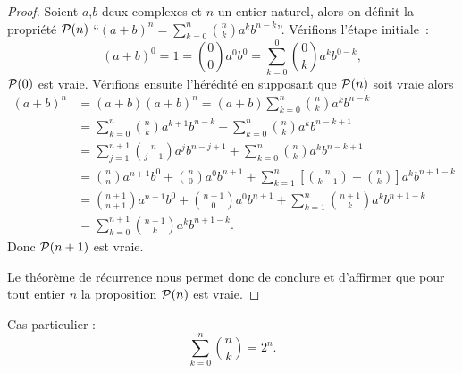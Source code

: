 \begin{proof}
  Soient \(a\),\(b\) deux complexes et \(n\) un entier naturel, alors on définit la propriété \(\P(n)\) ``\((a+b)^n=\sum_{k=0}^n \binom{n}{k}a^kb^{n-k}\)''. Vérifions l'étape initiale~:
\begin{equation}
  (a+b)^0=1=\binom{0}{0}a^0b^0=\sum_{k=0}^0 \binom{0}{k}a^kb^{0-k},
\end{equation}
\(\P(0)\) est vraie. Vérifions ensuite l'hérédité en supposant que \(\P(n)\) soit vraie alors
\begin{align}
  (a+b)^n&=(a+b)(a+b)^n=(a+b)\sum_{k=0}^n \binom{n}{k}a^kb^{n-k}\\
  &=\sum_{k=0}^n \binom{n}{k}a^{k+1}b^{n-k}+\sum_{k=0}^n \binom{n}{k}a^kb^{n-k+1}\\
  &=\sum_{j=1}^{n+1} \binom{n}{j-1}a^{j}b^{n-j+1}+\sum_{k=0}^n \binom{n}{k}a^kb^{n-k+1}\\
  &=\binom{n}{n}a^{n+1}b^0 +\binom{n}{0}a^0b^{n+1} + \sum_{k=1}^{n}\left[\binom{n}{k-1}+\binom{n}{k}\right]a^kb^{n+1-k}\\
  &=\binom{n+1}{n+1}a^{n+1}b^0+\binom{n+1}{0}a^0b^{n+1}+ \sum_{k=1}^{n}\binom{n+1}{k}a^kb^{n+1-k}\\
  &=\sum_{k=0}^{n+1}\binom{n+1}{k}a^kb^{n+1-k}.
\end{align}
Donc \(\P(n+1)\) est vraie.

Le théorème de récurrence nous permet donc de conclure et d'affirmer que pour tout entier \(n\) la proposition \(\P(n)\) est vraie.
\end{proof}
Cas particulier :
\begin{equation}
  \sum_{k=0}^n \binom{n}{k}=2^n.
\end{equation}

